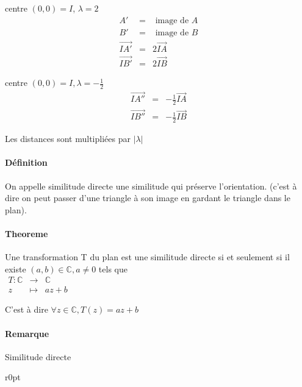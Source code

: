 centre $(0, 0) = I$, $\lambda = 2$
\[\begin{array}{rcl}
A' &=& \text{ image de } A \\
B' &=& \text{ image de } B \\
\vec{IA'} &=& 2\vec{IA} \\
\vec{IB'} &=& 2\vec{IB}\end{array}\]

centre $(0, 0) = I, \lambda = -\frac{1}{2}$
\[\begin{array}{rcl}
\vec{IA''} &=& -\frac{1}{2}\vec{IA} \\
\vec{IB''} &=& -\frac{1}{2}\vec{IB}\end{array}\]

Les distances sont multipliées par $|\lambda|$

\paragraph{Définition} On appelle similitude directe une similitude qui préserve l'orientation. (c'est à dire on peut passer d'une triangle à son image en gardant le triangle dans le plan).

\paragraph{Theoreme} Une transformation T du plan est une similitude directe si et seulement si il existe $(a, b) \in \mathbb{C}, a \neq 0$ tels que ~\\
$\begin{array}{rcl}
T : \mathbb{C} &\rightarrow& \mathbb{C} \\
z &\mapsto& az + b\end{array}$

C'est à dire $\forall z \in \mathbb{C}, T(z) = az + b$

\paragraph{Remarque} Similitude directe

\begin{wrapfigure}[6]{r}{0pt}
\end{wrapfigure}


